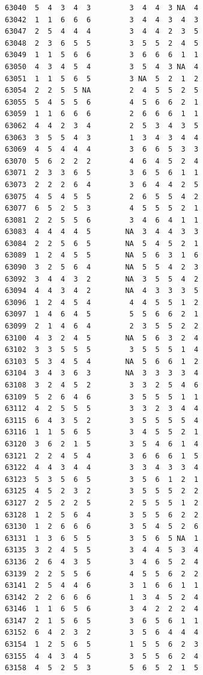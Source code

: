 \documentclass[
  letterpaper,
  DIV=11,
  numbers=noendperiod]{scrreprt}
\begin{document}
\begin{verbatim}
63040  5  4  3  4  3         3  4  4  3 NA  4
63042  1  1  6  6  6         3  4  4  3  4  3
63047  2  5  4  4  4         3  4  4  2  3  5
63048  2  3  6  5  5         3  5  5  2  4  5
63049  1  1  5  6  6         3  6  6  6  1  1
63050  4  3  4  5  4         3  5  4  3 NA  4
63051  1  1  5  6  5         3 NA  5  2  1  2
63054  2  2  5  5 NA         2  4  5  5  2  5
63055  5  4  5  5  6         4  5  6  6  2  1
63059  1  1  6  6  6         2  6  6  6  1  1
63062  4  4  2  3  4         2  5  3  4  3  5
63063  3  5  5  4  3         1  3  4  3  4  4
63069  4  5  4  4  4         3  6  6  5  3  3
63070  5  6  2  2  2         4  6  4  5  2  4
63071  2  3  3  6  5         3  6  5  6  1  1
63073  2  2  2  6  4         3  6  4  4  2  5
63075  4  5  4  5  5         2  6  5  5  4  2
63077  6  5  2  5  3         4  5  5  5  2  1
63081  2  2  5  5  6         3  4  6  4  1  1
63083  4  4  4  4  5        NA  3  4  4  3  3
63084  2  2  5  6  5        NA  5  4  5  2  1
63089  1  2  4  5  5        NA  5  6  3  1  6
63090  3  2  5  6  4        NA  5  5  4  2  3
63092  3  4  4  3  2        NA  3  5  5  4  2
63094  4  4  3  4  2        NA  4  3  3  3  5
63096  1  2  4  5  4         4  4  5  5  1  2
63097  1  4  6  4  5         5  5  6  6  2  1
63099  2  1  4  6  4         2  3  5  5  2  2
63100  4  3  2  4  5        NA  5  6  3  2  4
63102  3  3  5  5  5         3  5  5  5  1  4
63103  5  3  4  5  4        NA  5  6  6  1  2
63104  3  4  3  6  3        NA  3  3  3  3  4
63108  3  2  4  5  2         3  3  2  5  4  6
63109  5  2  6  4  6         3  5  5  5  1  1
63112  4  2  5  5  5         3  3  2  3  4  4
63115  6  4  3  5  2         3  5  5  5  5  4
63116  1  1  5  6  5         3  4  5  5  2  1
63120  3  6  2  1  5         3  5  4  6  1  4
63121  2  2  4  5  4         3  6  6  6  1  5
63122  4  4  3  4  4         3  3  4  3  3  4
63123  5  3  5  6  5         3  5  6  1  2  1
63125  4  5  2  3  2         3  5  5  5  2  2
63127  2  5  2  2  5         2  5  5  5  1  2
63128  1  2  5  6  4         3  5  5  6  2  2
63130  1  2  6  6  6         3  5  4  5  2  6
63131  1  3  6  5  5         3  5  6  5 NA  1
63135  3  2  4  5  5         3  4  4  5  3  4
63136  2  6  4  3  5         3  4  6  5  2  4
63139  2  2  5  5  6         4  5  5  6  2  2
63141  2  5  4  4  6         3  1  6  6  1  1
63142  2  2  6  6  6         1  3  4  5  2  4
63146  1  1  6  5  6         3  4  2  2  2  4
63147  2  1  5  6  5         3  6  5  6  1  1
63152  6  4  2  3  2         3  5  6  4  4  4
63154  1  2  5  6  5         1  5  5  6  2  3
63155  4  4  3  4  5         3  5  5  6  2  4
63158  4  5  2  5  3         5  6  5  2  1  5

\end{verbatim}
\end{document}
